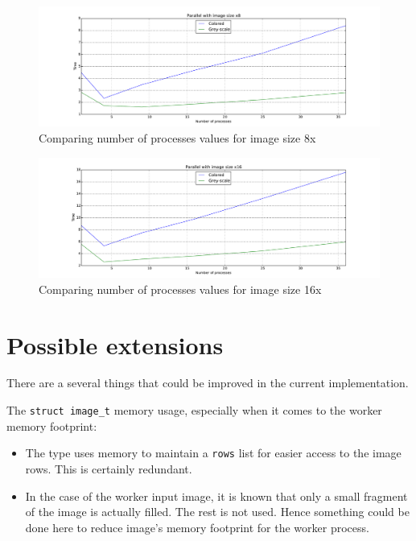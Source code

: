 \documentclass[11pt,a4paper,oneside]{article}
\begin{document}
\begin{figure}[h]
    \centering
    \includegraphics[width=\textwidth]{parallel-8.pdf}
    \caption{Comparing number of processes values for image size 8x}
\end{figure}

\begin{figure}[h]
    \centering
    \includegraphics[width=\textwidth]{parallel-16.pdf}
    \caption{Comparing number of processes values for image size 16x}
\end{figure}



\section{Possible extensions}

There are a several things that could be improved in the current
implementation.

The \texttt{struct image\_t} memory usage, especially when it comes to the
worker memory footprint:
\begin{itemize}
    \item The type uses memory to maintain a \texttt{rows} list for easier
        access to the image rows. This is certainly redundant.
    \item In the case of the worker input image, it is known that
        only a small fragment of the image is actually filled. The rest
        is not used. Hence something could be done here to reduce image's
        memory footprint for the worker process.
\end{itemize}
\end{document}
